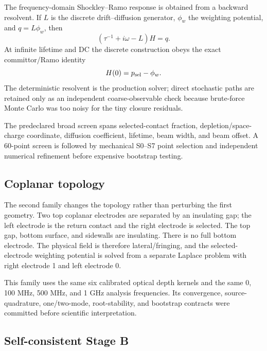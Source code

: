\documentclass[11pt]{article}
\begin{document}
The frequency-domain Shockley--Ramo response is obtained from a backward resolvent. If $L$ is the discrete drift--diffusion generator, $\phi_w$ the weighting potential, and $q=L\phi_w$, then
\begin{equation}
(\tau^{-1}+i\omega-L)H=q.
\label{eq:resolvent}
\end{equation}
At infinite lifetime and DC the discrete construction obeys the exact committor/Ramo identity
\begin{equation}
H(0)=p_{\rm sel}-\phi_w.
\label{eq:ramoid}
\end{equation}
The deterministic resolvent is the production solver; direct stochastic paths are retained only as an independent coarse-observable check because brute-force Monte Carlo was too noisy for the tiny closure residuals.

The predeclared broad screen spans selected-contact fraction, depletion/space-charge coordinate, diffusion coefficient, lifetime, beam width, and beam offset. A 60-point screen is followed by mechanical S0--S7 point selection and independent numerical refinement before expensive bootstrap testing.

\subsection{Coplanar topology}

The second family changes the topology rather than perturbing the first geometry. Two top coplanar electrodes are separated by an insulating gap; the left electrode is the return contact and the right electrode is selected. The top gap, bottom surface, and sidewalls are insulating. There is no full bottom electrode. The physical field is therefore lateral/fringing, and the selected-electrode weighting potential is solved from a separate Laplace problem with right electrode 1 and left electrode 0.

This family uses the same six calibrated optical depth kernels and the same 0, 100 MHz, 500 MHz, and 1 GHz analysis frequencies. Its convergence, source-quadrature, one/two-mode, root-stability, and bootstrap contracts were committed before scientific interpretation.

\subsection{Self-consistent Stage B}
\end{document}
